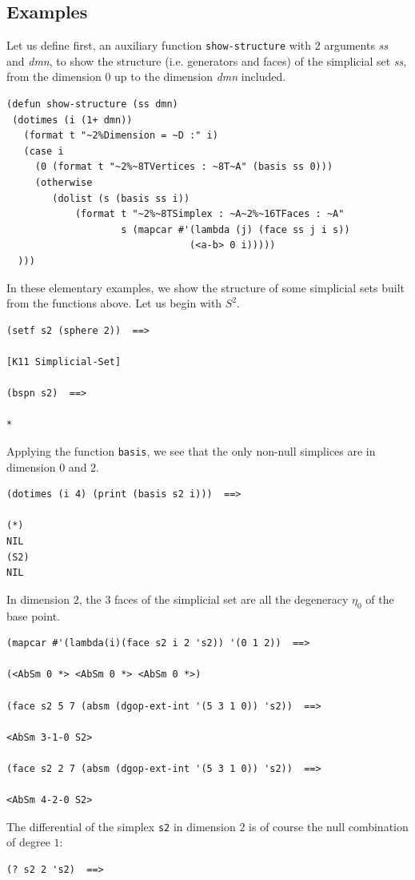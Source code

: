 {\subsection*{Examples}

Let us define first, an auxiliary function {\tt show-structure} 
with $2$ arguments {\em ss} and {\em dmn},
to show the structure (i.e. generators and faces) of the simplicial set  {\em ss},  
from the dimension $0$ up to the dimension {\em dmn} included.
{\footnotesize\begin{verbatim}
(defun show-structure (ss dmn)
 (dotimes (i (1+ dmn))
   (format t "~2%Dimension = ~D :" i)
   (case i
     (0 (format t "~2%~8TVertices : ~8T~A" (basis ss 0)))
     (otherwise
        (dolist (s (basis ss i))
            (format t "~2%~8TSimplex : ~A~2%~16TFaces : ~A"
                    s (mapcar #'(lambda (j) (face ss j i s))
                                (<a-b> 0 i)))))
  )))
\end{verbatim}}
In these elementary examples, we show the structure of some simplicial sets built
from the functions above. Let us begin with $S^2$.

{\footnotesize\begin{verbatim}
(setf s2 (sphere 2))  ==>

[K11 Simplicial-Set]

(bspn s2)  ==>

*
\end{verbatim}}
Applying the function {\tt basis}, we see that the only non-null simplices are in dimension $0$
and $2$.
{\footnotesize\begin{verbatim}
(dotimes (i 4) (print (basis s2 i)))  ==>

(*) 
NIL 
(S2) 
NIL 
\end{verbatim}}
In dimension $2$, the $3$ faces of the simplicial set are all the degeneracy $\eta_0$ 
of the base point.
{\footnotesize\begin{verbatim}
(mapcar #'(lambda(i)(face s2 i 2 's2)) '(0 1 2))  ==>

(<AbSm 0 *> <AbSm 0 *> <AbSm 0 *>)

(face s2 5 7 (absm (dgop-ext-int '(5 3 1 0)) 's2))  ==>

<AbSm 3-1-0 S2>

(face s2 2 7 (absm (dgop-ext-int '(5 3 1 0)) 's2))  ==>

<AbSm 4-2-0 S2>
\end{verbatim}}
The differential of the simplex {\tt s2} in dimension $2$ is of course the null combination
of degree $1$:
{\footnotesize\begin{verbatim}
(? s2 2 's2)  ==>


\end{verbatim}}}
